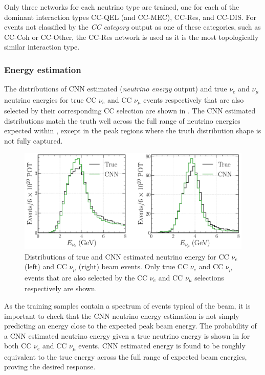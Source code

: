 Only three networks for each neutrino type are trained, one for each of the dominant interaction
types CC-QEL (and CC-MEC), CC-Res, and CC-DIS. For events not classified by the \emph{CC category}
output as one of these categories, such as CC-Coh or CC-Other, the CC-Res network is used as it is
the most topologically similar interaction type.

\subsubsection*{Energy estimation} %

The distributions of CNN estimated (\emph{neutrino energy} output) and true $\nu_{e}$ and
$\nu_{\mu}$ neutrino energies for true CC $\nu_{e}$ and CC $\nu_{\mu}$ events respectively that
are also selected by their corresponding CC selection are shown in
. The CNN estimated distributions match the truth well across
the full range of neutrino energies expected within \chipsfive, except in the peak regions where
the truth distribution shape is not fully captured.

\begin{figure} %
    \includegraphics[width=\textwidth]{diagrams/7-results/final_energy_dists.pdf}
    \caption[Distributions of true and CNN estimated neutrino energy]
    {Distributions of true and CNN estimated neutrino energy for CC $\nu_{e}$ (left) and CC
        $\nu_{\mu}$ (right) beam events. Only true CC $\nu_{e}$ and CC $\nu_{\mu}$ events that are
        also selected by the CC $\nu_{e}$ and CC $\nu_{\mu}$ selections respectively are shown.}
    \label{fig:final_energy_dists}
\end{figure}

As the training samples contain a spectrum of events typical of the beam, it is important to check
that the CNN neutrino energy estimation is not simply predicting an energy close to the expected
peak beam energy. The probability of a CNN estimated neutrino energy given a true neutrino energy
is shown in  for both CC $\nu_{e}$ and CC $\nu_{\mu}$ events. CNN
estimated energy is found to be roughly equivalent to the true energy across the full range of
expected \chipsfive beam energies, proving the desired response.

